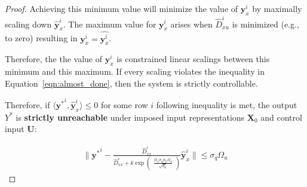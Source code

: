 \documentclass{article} %
\begin{document}
\begin{proof}
    Achieving this minimum value will minimize the value of $\mathbf y_x^i$ by maximally scaling down $\hat{\mathbf y}_x^i$. 
    The maximum value for $\mathbf y_x^i$ arises when $\hat{D}_{xu}^i$ is minimized (e.g., to zero) resulting in $\mathbf y_x^i = \hat{\mathbf y_x^i}$. 

    Therefore, the the value of $\mathbf y_x^i$ is constrained linear scalings between this minimum and this maximum. 
    If every scaling violates the inequality in Equation~\ref{eqn:almost_done}, then the system is strictly controllable. 

    Therefore, if $\langle {\mathbf y^*}^i, \hat {\mathbf y}_x^i  \rangle \leq 0$ for some row $i$ 
    following inequality is met, the output $Y^*$ is \textbf{strictly unreachable} under imposed input representations $\mathbf X_0$ and control input $\mathbf U$: 

    \begin{align}
        \label{eqn:finale}
        \| {\mathbf y^*}^i - \frac{
            \hat D_{xx}^i
        }{
            \hat D_{xx}^i + k \exp \begin{pmatrix}
            \frac{\Omega_x \sigma_q \sigma_k \Omega_u}{\sqrt{d_k}}
        \end{pmatrix}
        }
        \hat{\mathbf y}_x^i \| 
        \leq 
        \sigma_q \Omega_u
    \end{align}





\end{proof}
\end{document}
